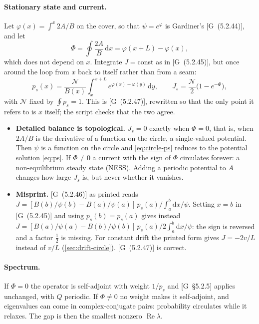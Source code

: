 \documentclass[11pt]{article}
\numberwithin{equation}{section}
\newcommand{\dd}{\mathrm{d}}
\newcommand{\G}[1]{[G~(#1)]}
\newcommand{\Gs}[1]{[G~\S#1]}
\begin{document}
\paragraph{Stationary state and current.} Let $\varphi(x)=\int^x2A/B$ on the cover, so that $\psi=e^\varphi$
is Gardiner's \G{5.2.44}, and let
\begin{equation}
  \Phi=\oint\frac{2A}{B}\,\dd x=\varphi(x+L)-\varphi(x),
\end{equation}
which does not depend on $x$. Integrate $J={}$const as in \G{5.2.45}, but once around the loop from $x$ back to
itself rather than from a seam:
\begin{equation}
  p_s(x)=\frac{\mathcal N}{B(x)}\int_x^{x+L}e^{\varphi(x)-\varphi(y)}\,\dd y,\qquad
  J_s=\frac{\mathcal N}{2}\bigl(1-e^{-\Phi}\bigr),
  \label{eq:circle-ps}
\end{equation}
with $\mathcal N$ fixed by $\oint p_s=1$. This is \G{5.2.47}, rewritten so that the only point it refers to is
$x$ itself; the script checks that the two agree.
\begin{itemize}
  \item \textbf{Detailed balance is topological.} $J_s=0$ exactly when $\Phi=0$, that is, when $2A/B$ is the
        derivative of a function on the circle, a single-valued potential. Then $\psi$ is a function on the
        circle and \cref{eq:circle-ps} reduces to the potential solution \cref{eq:ps}. If $\Phi\neq0$ a current
        with the sign of $\Phi$ circulates forever: a non-equilibrium steady state (NESS). Adding a periodic
        potential to $A$ changes how large $J_s$ is, but never whether it vanishes.
  \item \textbf{Misprint.} \G{5.2.46} as printed reads
        $J=[B(b)/\psi(b)-B(a)/\psi(a)]\,p_s(a)\big/\!\int_a^b\dd x/\psi$. Setting $x=b$ in \G{5.2.45} and using
        $p_s(b)=p_s(a)$ gives instead $J=[B(a)/\psi(a)-B(b)/\psi(b)]\,p_s(a)\big/2\!\int_a^b\dd x/\psi$: the sign
        is reversed and a factor $\tfrac12$ is missing. For constant drift the printed form gives $J=-2v/L$
        instead of $v/L$ (\cref{sec:drift-circle}). \G{5.2.47} is correct.
\end{itemize}

\paragraph{Spectrum.} If $\Phi=0$ the operator is self-adjoint with weight $1/p_s$ and \Gs{5.2.5} applies
unchanged, with $Q$ periodic. If $\Phi\neq0$ no weight makes it self-adjoint, and eigenvalues can come in
complex-conjugate pairs: probability circulates while it relaxes. The gap is then the smallest nonzero
$\operatorname{Re}\lambda$.
\end{document}
